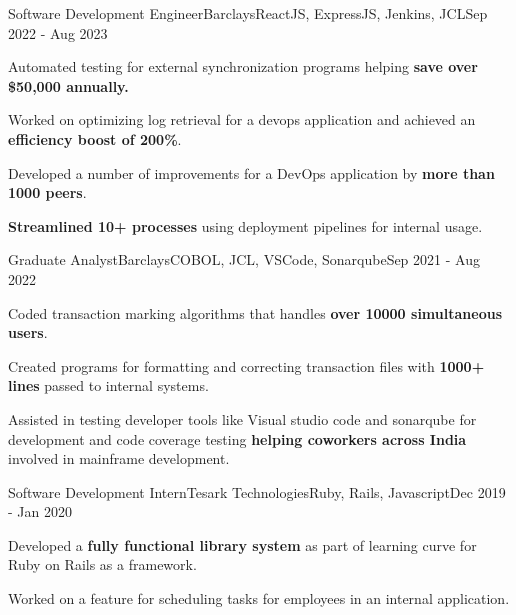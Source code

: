 \documentclass[letterpaper]{resume_config}
\begin{document}
\WorkExperience
    {Software Development Engineer}{Barclays}{ReactJS, ExpressJS, Jenkins, JCL}{Sep 2022 - Aug 2023}
    {
        \item{Automated testing for external synchronization programs helping \textbf{save over \$50,000 annually.}}
        \item {Worked on optimizing log retrieval for a devops application and achieved an \textbf{efficiency boost of 200\%}.}
        \item {Developed a number of improvements for a DevOps application by \textbf{more than 1000 peers}.} 
        \item {\textbf{Streamlined 10+ processes} using deployment pipelines for internal usage.}
    }
\WorkExperience
    {Graduate Analyst}{Barclays}{COBOL, JCL, VSCode, Sonarqube}{Sep 2021 - Aug 2022}
    {
        \item {Coded transaction marking algorithms that handles \textbf{over 10000 simultaneous users}.}
        \item {Created programs for formatting and correcting transaction files with \textbf{1000+ lines} passed to internal systems.}
        \item {Assisted in testing developer tools like Visual studio code and sonarqube for development and code coverage testing \textbf{helping coworkers across India} involved in mainframe development.}
    }
\WorkExperience
    {Software Development Intern}{Tesark Technologies}{Ruby, Rails, Javascript}{Dec 2019 - Jan 2020}
    {
        \item {Developed a \textbf{fully functional library system} as part of learning curve for Ruby on Rails as a framework.}
        \item {Worked on a feature for scheduling tasks for employees in an internal application.}
    }

\vspace{-5pt}
\end{document}
